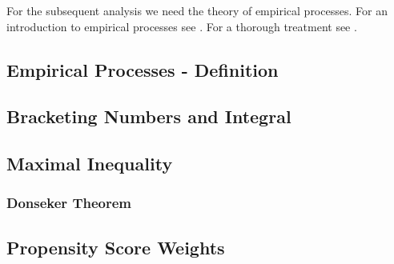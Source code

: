 For the subsequent analysis we need the theory of empirical processes.
For an introduction to empirical processes see \cite[§19]{Vaart2000}. For a thorough treatment see \cite[§2]{vaart2013}. 
\subsection{Empirical Processes - Definition}
  
\subsection{Bracketing Numbers and Integral}
  
\subsection{Maximal Inequality}
  
\subsubsection{Donseker Theorem}
\subsection{Propensity Score Weights}
  
